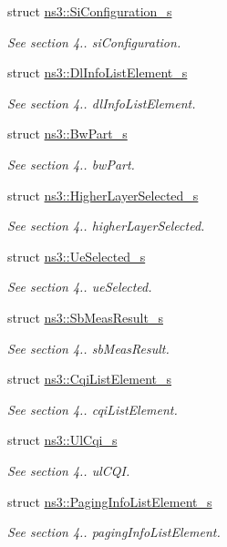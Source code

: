 \begin{DoxyCompactItemize}
struct \hyperlink{structns3_1_1SiConfiguration__s}{ns3\+::\+Si\+Configuration\+\_\+s}
\begin{DoxyCompactList}\small\item\em See section 4.. si\+Configuration. \end{DoxyCompactList}\item 
struct \hyperlink{structns3_1_1DlInfoListElement__s}{ns3\+::\+Dl\+Info\+List\+Element\+\_\+s}
\begin{DoxyCompactList}\small\item\em See section 4.. dl\+Info\+List\+Element. \end{DoxyCompactList}\item 
struct \hyperlink{structns3_1_1BwPart__s}{ns3\+::\+Bw\+Part\+\_\+s}
\begin{DoxyCompactList}\small\item\em See section 4.. bw\+Part. \end{DoxyCompactList}\item 
struct \hyperlink{structns3_1_1HigherLayerSelected__s}{ns3\+::\+Higher\+Layer\+Selected\+\_\+s}
\begin{DoxyCompactList}\small\item\em See section 4.. higher\+Layer\+Selected. \end{DoxyCompactList}\item 
struct \hyperlink{structns3_1_1UeSelected__s}{ns3\+::\+Ue\+Selected\+\_\+s}
\begin{DoxyCompactList}\small\item\em See section 4.. ue\+Selected. \end{DoxyCompactList}\item 
struct \hyperlink{structns3_1_1SbMeasResult__s}{ns3\+::\+Sb\+Meas\+Result\+\_\+s}
\begin{DoxyCompactList}\small\item\em See section 4.. sb\+Meas\+Result. \end{DoxyCompactList}\item 
struct \hyperlink{structns3_1_1CqiListElement__s}{ns3\+::\+Cqi\+List\+Element\+\_\+s}
\begin{DoxyCompactList}\small\item\em See section 4.. cqi\+List\+Element. \end{DoxyCompactList}\item 
struct \hyperlink{structns3_1_1UlCqi__s}{ns3\+::\+Ul\+Cqi\+\_\+s}
\begin{DoxyCompactList}\small\item\em See section 4.. ul\+C\+QI. \end{DoxyCompactList}\item 
struct \hyperlink{structns3_1_1PagingInfoListElement__s}{ns3\+::\+Paging\+Info\+List\+Element\+\_\+s}
\begin{DoxyCompactList}\small\item\em See section 4.. paging\+Info\+List\+Element. \end{DoxyCompactList}\end{DoxyCompactItemize}
